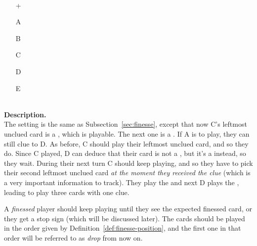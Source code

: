 \begin{example} \hfill \\
	\begin{minipage}{0.45\textwidth}
		\begin{itemize}
			\item[\Large +]      
			\item[\Large A]    
			\item[\Large B]    
			\item[\Large C]    
			\item[\Large D]    
			\item[\Large E]    
		\end{itemize}
	\end{minipage}%
	\begin{minipage}{0.55\textwidth}
		\hfill \\
		
		\textbf{Description.} \\
		
		The setting is the same as Subsection~\ref{sec:finesse}, except that now C's leftmost unclued card is a , which is playable. The next one is a . If A is to play, they can still clue  to D. As before, C should play their leftmost unclued card, and so they do. Since C played, D can deduce that their card is not a , but it's a  instead, so they wait. During their next turn C should keep playing, and so they have to pick their second leftmost unclued card \emph{at the moment they received the clue} (which is a very important information to track). They play the  and next D plays the , leading to play three cards with one clue.
	\end{minipage}
\end{example} \vspace{0.15 cm}

\begin{remark}
	A \emph{finessed} player should keep playing until they see the expected finessed card, or they get a stop sign (which will be discussed later). The cards should be played in the order given by Definition~\ref{def:finesse-position}, and the first one in that order will be referred to as \emph{drop} from now on.
\end{remark}

